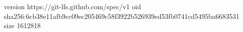 version https://git-lfs.github.com/spec/v1
oid sha256:6cb38e11afb9cc09ec205469c58f3922b526939ed53fb0741cd5495ba6683531
size 1612818
